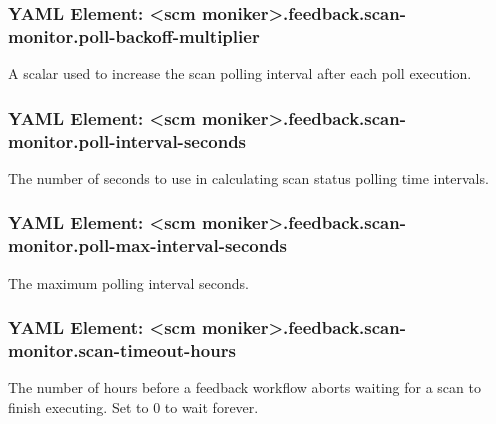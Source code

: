 \subsubsection{YAML Element: <scm moniker>.feedback.scan-monitor.poll-backoff-multiplier}\label{sec:yaml-scan-monitor-poll-backoff-multiplier}
A scalar used to increase the scan polling interval after each poll execution.

\subsubsection{YAML Element: <scm moniker>.feedback.scan-monitor.poll-interval-seconds}\label{sec:yaml-scan-monitor-poll-interval-seconds}
The number of seconds to use in calculating scan status polling time intervals.

\subsubsection{YAML Element: <scm moniker>.feedback.scan-monitor.poll-max-interval-seconds}\label{sec:yaml-scan-monitor-poll-max-interval-seconds}
The maximum polling interval seconds.

\subsubsection{YAML Element: <scm moniker>.feedback.scan-monitor.scan-timeout-hours}\label{sec:yaml-scan-monitor-scan-timeout-hours}
The number of hours before a feedback workflow aborts waiting for a scan to finish executing.  Set to 0 to wait forever.
